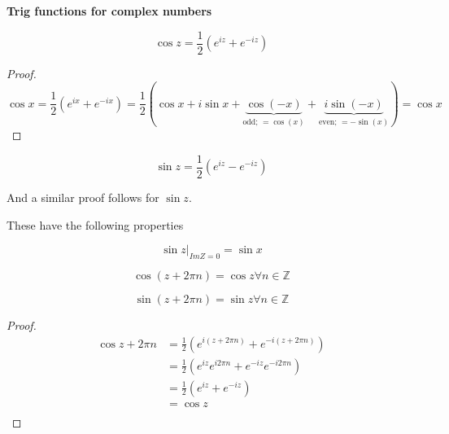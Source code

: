 \documentclass[../notes.tex]{subfiles}
\begin{document}
\begin{definition}
	\textbf{Trig functions for complex numbers} 

	\begin{equation}
		\cos z = \frac{1}{2} \left( e^{iz} + e^{-iz} \right)
	\end{equation}

	\begin{proof}
	\begin{equation}
		\cos x = \frac{1}{2} (e^{ix} + e^{-ix}) = \frac{1}{2} 
		\left( \cos x 
		+ i \sin x 
		+ \underbrace{\cos(-x)}_{\text{odd; } = \cos(x)}
		+ \underbrace{i \sin(-x)}_{\text{even; } = -\sin(x)} \right)
		= \cos x
	\end{equation}
	\end{proof}
	

	\begin{equation}
		\sin z = \frac{1}{2} \left( e^{iz} - e^{-iz} \right)
	\end{equation}

	And a similar proof follows for $\sin z$.

	These have the following properties


	\begin{equation}
		\sin z |_{Im Z = 0} = \sin x
	\end{equation}

	\begin{equation}
		\cos(z + 2 \pi n) = \cos z \forall n \in \mathbb{Z}
	\end{equation}

	\begin{equation}
		\sin(z + 2 \pi n) = \sin z \forall n \in \mathbb{Z}
	\end{equation}
\end{definition}

\begin{proof}
	\begin{equation}
		\begin{split}
			\cos z + 2\pi n &= \frac{1}{2}(e^{i(z+2\pi n)} + e^{-i(z+2\pi n)}) \\
											&= \frac{1}{2}(e^{iz}e^{i2\pi n} + e^{-iz}e^{-i2\pi n}) \\
											&= \frac{1}{2}(e^{iz} + e^{-iz}) \\
											&= \cos z \\
		\end{split}
	\end{equation}

\end{proof}
\end{document}
